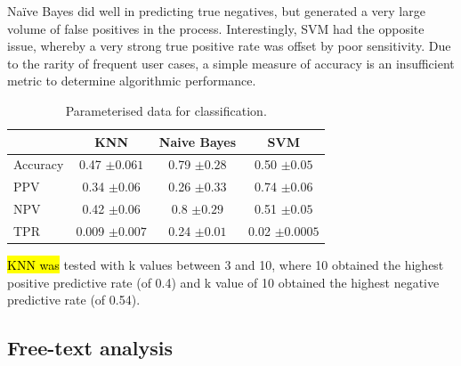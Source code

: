  
 
 
 
 



Naïve Bayes did well in predicting true negatives, but generated a very large volume of false positives in the process. Interestingly, SVM had the opposite issue, whereby a very strong true positive rate was offset by poor sensitivity. Due to the rarity of frequent user cases, a simple measure of accuracy is an insufficient metric to determine algorithmic performance.         




 
 
 
 
 \begin{table}[h]
 \begin{center}

   \caption{Parameterised data for classification.}
    \label{table:parameterised-data}
\begin{tabular}{|l|c|c|c|}

\hline
            & \textbf{KNN\index{K-nearest neigbour}}                & \textbf{Naive Bayes\index{Naïve Bayes}} & \textbf{SVM \index{Support Vector Machines}}        \\ \hline
  Accuracy    & 0.47 $\pm 0.061$                 & 0.79 $\pm 0.28$     & 0.50 $\pm 0.05$        \\ \hline
PPV         & 0.34 $\pm 0.06$               & 0.26  $\pm 0.33$    & 0.74 $\pm 0.06$            \\ \hline
NPV         & 0.42 $\pm 0.06$               & 0.8 $\pm 0.29$     & 0.51 $\pm 0.05$          \\ \hline
TPR         & 0.009 $\pm 0.007$                 & 0.24 $\pm 0.01$      & 0.02 $\pm 0.0005$           \\ \hline
 
 
 
 
\end{tabular}
 \end{center}

\end{table}
 
 \hl{KNN was} tested with k values between 3 and 10, where 10 obtained the highest positive predictive  rate (of 0.4) and k value of 10 obtained the highest negative predictive rate (of 0.54).  

 
 \subsection{Free-text analysis}

